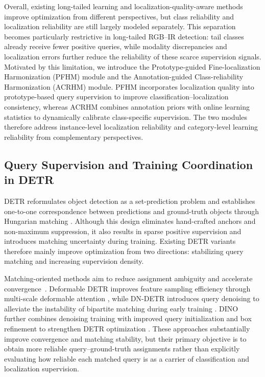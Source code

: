 \documentclass[letterpaper,journal]{IEEEtran}
\begin{document}
Overall, existing long-tailed learning and localization-quality-aware methods improve optimization from different perspectives, but class reliability and localization reliability are still largely modeled separately. This separation becomes particularly restrictive in long-tailed RGB--IR detection: tail classes already receive fewer positive queries, while modality discrepancies and localization errors further reduce the reliability of these scarce supervision signals. Motivated by this limitation, we introduce the Prototype-guided Fine-localization Harmonization (PFHM) module and the Annotation-guided Class-reliability Harmonization (ACRHM) module. PFHM incorporates localization quality into prototype-based query supervision to improve classification--localization consistency, whereas ACRHM combines annotation priors with online learning statistics to dynamically calibrate class-specific supervision. The two modules therefore address instance-level localization reliability and category-level learning reliability from complementary perspectives.

\subsection{Query Supervision and Training Coordination in DETR}
DETR reformulates object detection as a set-prediction problem and establishes one-to-one correspondence between predictions and ground-truth objects through Hungarian matching \cite{detr}. Although this design eliminates hand-crafted anchors and non-maximum suppression, it also results in sparse positive supervision and introduces matching uncertainty during training. Existing DETR variants therefore mainly improve optimization from two directions: stabilizing query matching and increasing supervision density.

Matching-oriented methods aim to reduce assignment ambiguity and accelerate convergence~\cite{align_detr,salience_detr}. Deformable DETR improves feature sampling efficiency through multi-scale deformable attention \cite{deformable_detr}, while DN-DETR introduces query denoising to alleviate the instability of bipartite matching during early training \cite{dn_detr}. DINO further combines denoising training with improved query initialization and box refinement to strengthen DETR optimization \cite{dino}. These approaches substantially improve convergence and matching stability, but their primary objective is to obtain more reliable query--ground-truth assignments rather than explicitly evaluating how reliable each matched query is as a carrier of classification and localization supervision.
\end{document}
